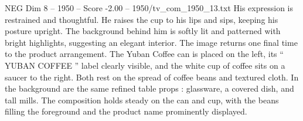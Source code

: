 \begin{textsample}{NEG Dim 8 – 1950 – Score -2.00 – 1950/tv\_com\_1950\_13.txt}
His expression is restrained and thoughtful.
He raises the cup to his lips and sips, keeping his posture upright.
The background behind him is softly lit and patterned with bright highlights, suggesting an elegant interior.
The image returns one final time to the product arrangement.
The Yuban Coffee can is placed on the left, its “ YUBAN COFFEE ” label clearly visible, and the white cup of coffee sits on a saucer to the right.
Both rest on the spread of coffee beans and textured cloth.
In the background are the same refined table props : glassware, a covered dish, and tall mills.
The composition holds steady on the can and cup, with the beans filling the foreground and the product name prominently displayed.

\end{textsample}
